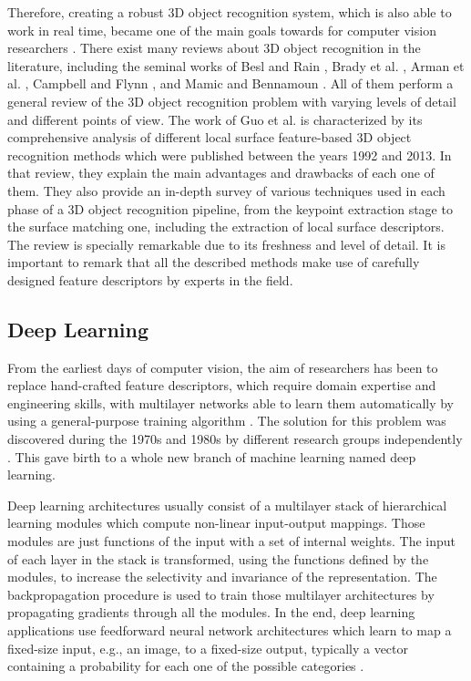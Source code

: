 Therefore, creating a robust \acs{3D} object recognition system, which is also able to work in real time, became one of the main goals towards for computer vision researchers \cite{Ponce2004}. There exist many reviews about \acs{3D} object recognition in the literature, including the seminal works of Besl and Rain \cite{Besl1985}, Brady et al. \cite{Brady1989}, Arman et al. \cite{Arman1993}, Campbell and Flynn \cite{Campbell2001}, and Mamic and Bennamoun \cite{Mamic2002}. All of them perform a general review of the \acs{3D} object recognition problem with varying levels of detail and different points of view. The work of Guo et al. \cite{Guo2014} is characterized by its comprehensive analysis of different local surface feature-based \acs{3D} object recognition methods which were published between the years 1992 and 2013. In that review, they explain the main advantages and drawbacks of each one of them. They also provide an in-depth survey of various techniques used in each phase of a \acs{3D} object recognition pipeline, from the keypoint extraction stage to the surface matching one, including the extraction of local surface descriptors. The review is specially remarkable due to its freshness and level of detail. It is important to remark that all the described methods make use of carefully designed feature descriptors by experts in the field.

\subsection{Deep Learning}
\label{cha:objrecog:sec:relatedworks:subsec:deeplearning}

From the earliest days of computer vision, the aim of researchers has been to replace hand-crafted feature descriptors, which require domain expertise and engineering skills, with multilayer networks able to learn them automatically by using a general-purpose training algorithm \cite{Lecun2015}. The solution for this problem was discovered during the 1970s and 1980s by different research groups independently \cite{Werbos1974}\cite{LeCun1985}\cite{Rumelhart1988}. This gave birth to a whole new branch of machine learning named deep learning.

Deep learning architectures usually consist of a multilayer stack of hierarchical learning modules which compute non-linear input-output mappings. Those modules are just functions of the input with a set of internal weights. The input of each layer in the stack is transformed, using the functions defined by the modules, to increase the selectivity and invariance of the representation. The backpropagation procedure is used to train those multilayer architectures by propagating gradients through all the modules. In the end, deep learning applications use feedforward neural network architectures which learn to map a fixed-size input, e.g., an image, to a fixed-size output, typically a vector containing a probability for each one of the possible categories \cite{Lecun2015}.

